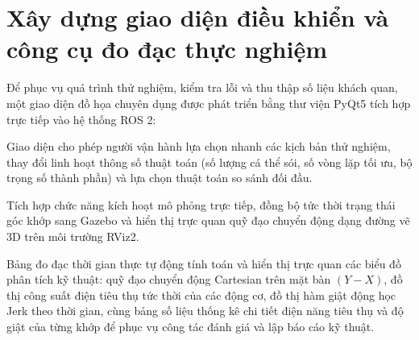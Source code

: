 \begin{table}[htbp]
\centering
\caption{Tổng hợp kết quả thử nghiệm đối chuẩn giữa ROS 2 truyền thống và giải thuật đề xuất qua 7 kịch bản}
\label{tab:benchmark_scenarios_summary}
\end{table}

\section{Xây dựng giao diện điều khiển và công cụ đo đạc thực nghiệm}
\label{sec:gui_benchmark_tool}

Để phục vụ quá trình thử nghiệm, kiểm tra lỗi và thu thập số liệu khách quan, một giao diện đồ họa chuyên dụng được phát triển bằng thư viện PyQt5 tích hợp trực tiếp vào hệ thống ROS 2:

Giao diện cho phép người vận hành lựa chọn nhanh các kịch bản thử nghiệm, thay đổi linh hoạt thông số thuật toán (số lượng cá thể sói, số vòng lặp tối ưu, bộ trọng số thành phần) và lựa chọn thuật toán so sánh đối đầu.

Tích hợp chức năng kích hoạt mô phỏng trực tiếp, đồng bộ tức thời trạng thái góc khớp sang Gazebo và hiển thị trực quan quỹ đạo chuyển động dạng đường vẽ 3D trên môi trường RViz2.

Bảng đo đạc thời gian thực tự động tính toán và hiển thị trực quan các biểu đồ phân tích kỹ thuật: quỹ đạo chuyển động Cartesian trên mặt bàn $(Y-X)$, đồ thị công suất điện tiêu thụ tức thời của các động cơ, đồ thị hàm giật động học Jerk theo thời gian, cùng bảng số liệu thống kê chi tiết điện năng tiêu thụ và độ giật của từng khớp để phục vụ công tác đánh giá và lập báo cáo kỹ thuật.


